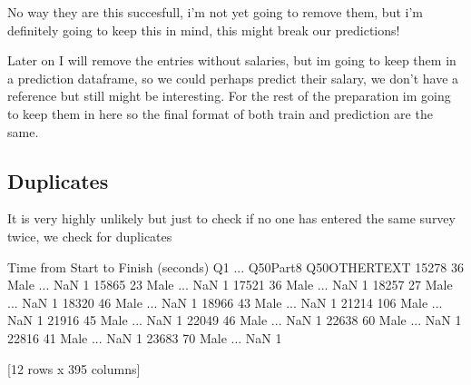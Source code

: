 \documentclass[letterpaper,10pt,english]{jupyterBook}
\begin{document}
\sphinxAtStartPar
No way they are this succesfull, i’m not yet going to remove them, but i’m definitely going to keep this in mind, this might break our predictions!

\sphinxAtStartPar
Later on I will remove the entries without salaries, but im going to keep them in a prediction dataframe, so we could perhaps predict their salary, we don’t have a reference but still might be interesting. For the rest of the preparation im going to keep them in here so the final format of both train and prediction are the same.


\subsection{Duplicates}
\label{\detokenize{c7_case_studies/UserSurvey:duplicates}}
\sphinxAtStartPar
It is very highly unlikely but just to check if no one has entered the same survey twice, we check for duplicates

\begin{sphinxVerbatim}[commandchars=\\\{\}]
\PYG{p}{[}\PYG{p}{]}
\end{sphinxVerbatim}

\begin{sphinxVerbatim}[commandchars=\\\{\}]
      Time from Start to Finish (seconds)    Q1  ... Q50\PYGZus{}Part\PYGZus{}8 Q50\PYGZus{}OTHER\PYGZus{}TEXT
15278                                  36  Male  ...        NaN             \PYGZhy{}1
15865                                  23  Male  ...        NaN             \PYGZhy{}1
17521                                  36  Male  ...        NaN             \PYGZhy{}1
18257                                  27  Male  ...        NaN             \PYGZhy{}1
18320                                  46  Male  ...        NaN             \PYGZhy{}1
18966                                  43  Male  ...        NaN             \PYGZhy{}1
21214                                 106  Male  ...        NaN             \PYGZhy{}1
21916                                  45  Male  ...        NaN             \PYGZhy{}1
22049                                  46  Male  ...        NaN             \PYGZhy{}1
22638                                  60  Male  ...        NaN             \PYGZhy{}1
22816                                  41  Male  ...        NaN             \PYGZhy{}1
23683                                  70  Male  ...        NaN             \PYGZhy{}1

[12 rows x 395 columns]
\end{sphinxVerbatim}
\end{document}
